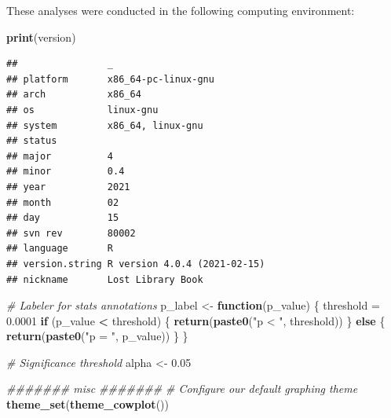\documentclass[]{book}
\newenvironment{Shaded}{\begin{snugshade}}{\end{snugshade}}
\newcommand{\CommentTok}[1]{\textcolor[rgb]{0.56,0.35,0.01}{\textit{#1}}}
\newcommand{\ControlFlowTok}[1]{\textcolor[rgb]{0.13,0.29,0.53}{\textbf{#1}}}
\newcommand{\DataTypeTok}[1]{\textcolor[rgb]{0.13,0.29,0.53}{#1}}
\newcommand{\FloatTok}[1]{\textcolor[rgb]{0.00,0.00,0.81}{#1}}
\newcommand{\KeywordTok}[1]{\textcolor[rgb]{0.13,0.29,0.53}{\textbf{#1}}}
\newcommand{\NormalTok}[1]{#1}
\newcommand{\OperatorTok}[1]{\textcolor[rgb]{0.81,0.36,0.00}{\textbf{#1}}}
\newcommand{\StringTok}[1]{\textcolor[rgb]{0.31,0.60,0.02}{#1}}
\begin{document}
These analyses were conducted in the following computing environment:

\begin{Shaded}
\begin{Highlighting}[]
\KeywordTok{print}\NormalTok{(version)}
\end{Highlighting}
\end{Shaded}

\begin{verbatim}
##                _                           
## platform       x86_64-pc-linux-gnu         
## arch           x86_64                      
## os             linux-gnu                   
## system         x86_64, linux-gnu           
## status                                     
## major          4                           
## minor          0.4                         
## year           2021                        
## month          02                          
## day            15                          
## svn rev        80002                       
## language       R                           
## version.string R version 4.0.4 (2021-02-15)
## nickname       Lost Library Book
\end{verbatim}

\begin{Shaded}
\begin{Highlighting}[]
\CommentTok{# Labeler for stats annotations}
\NormalTok{p_label <-}\StringTok{ }\ControlFlowTok{function}\NormalTok{(p_value) \{}
\NormalTok{  threshold =}\StringTok{ }\FloatTok{0.0001}
  \ControlFlowTok{if}\NormalTok{ (p_value }\OperatorTok{<}\StringTok{ }\NormalTok{threshold) \{}
    \KeywordTok{return}\NormalTok{(}\KeywordTok{paste0}\NormalTok{(}\StringTok{"p < "}\NormalTok{, threshold))}
\NormalTok{  \} }\ControlFlowTok{else}\NormalTok{ \{}
    \KeywordTok{return}\NormalTok{(}\KeywordTok{paste0}\NormalTok{(}\StringTok{"p = "}\NormalTok{, p_value))}
\NormalTok{  \}}
\NormalTok{\}}

\CommentTok{# Significance threshold}
\NormalTok{alpha <-}\StringTok{ }\FloatTok{0.05}

\CommentTok{####### misc #######}
\CommentTok{# Configure our default graphing theme}
\KeywordTok{theme_set}\NormalTok{(}\KeywordTok{theme_cowplot}\NormalTok{())}
\end{Highlighting}
\end{Shaded}

\begin{Shaded}
\end{Shaded}
\end{document}
